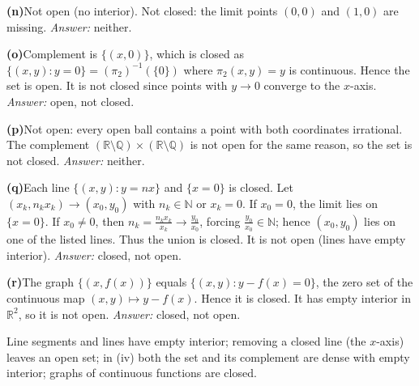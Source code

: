 \begin{problem}[CP-II-0471]
	\par\smallskip\noindent\textbf{(n)}\quad Not open (no interior). Not closed: the limit points $(0,0)$ and $(1,0)$ are missing. \emph{Answer:} neither.

	\par\smallskip\noindent\textbf{(o)}\quad Complement is $\{(x,0)\}$, which is closed as $\{(x,y):y=0\}=(\pi_2)^{-1}(\{0\})$ where $\pi_2(x,y)=y$ is continuous. Hence the set is open. It is not closed since points with $y\to 0$ converge to the $x$-axis. \emph{Answer:} open, not closed.

	\par\smallskip\noindent\textbf{(p)}\quad Not open: every open ball contains a point with both coordinates irrational. The complement
	$(\mathbb{R}\setminus\mathbb{Q})\times(\mathbb{R}\setminus\mathbb{Q})$ is not open for the same reason, so the set is not closed. \emph{Answer:} neither.

	\par\smallskip\noindent\textbf{(q)}\quad Each line $\{(x,y):y=nx\}$ and $\{x=0\}$ is closed. Let $(x_k,n_k x_k)\to(x_0,y_0)$ with $n_k\in\mathbb{N}$ or $x_k=0$.
	If $x_0=0$, the limit lies on $\{x=0\}$. If $x_0\neq 0$, then $n_k=\frac{n_k x_k}{x_k}\to \frac{y_0}{x_0}$, forcing $\frac{y_0}{x_0}\in\mathbb{N}$; hence $(x_0,y_0)$ lies on one of the listed lines. Thus the union is closed. It is not open (lines have empty interior). \emph{Answer:} closed, not open.

	\par\smallskip\noindent\textbf{(r)}\quad The graph $\{(x,f(x))\}$ equals $\{(x,y): y-f(x)=0\}$, the zero set of the continuous map $(x,y)\mapsto y-f(x)$. Hence it is closed. It has empty interior in $\mathbb{R}^2$, so it is not open. \emph{Answer:} closed, not open.

Line segments and lines have empty interior; removing a closed line (the $x$-axis) leaves an open set;
in (iv) both the set and its complement are dense with empty interior; graphs of continuous functions are closed.
\end{problem}

